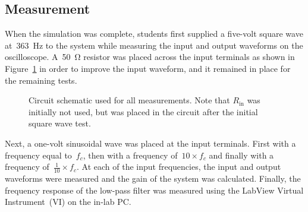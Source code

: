 \subsection{Measurement}
When the simulation was complete, students first supplied a five-volt square
wave at~\SI{363}{\hertz} to the system while measuring the input and output
waveforms on the oscilloscope.  A~\SI{50}{\ohm} resistor was placed across the
input terminals as shown in Figure~\ref{f:realSchem} in order to improve the
input waveform, and it remained in place for the remaining tests.
%
\begin{figure}[H]
	\centering
	
	\parbox{.6\textwidth}{
	\caption[Constructed Circuit Diagram]{Circuit schematic used for all
	measurements.  Note that $R_\text{in}$ was initially not used, but was
	placed in the circuit after the initial square wave test.}
	\label{f:realSchem}}
\end{figure}
%
Next, a one-volt sinusoidal wave was placed at the input terminals.  First with
a frequency equal to~$f_c$, then with a frequency of~$10 \times f_c$ and
finally with a frequency of~$\frac{1}{10} \times f_c$.  At each of the input
frequencies, the input and output waveforms were measured and the gain of the
system was calculated.  Finally, the frequency response of the low-pass filter
was measured using the LabView Virtual Instrument~(VI) on the in-lab PC.
